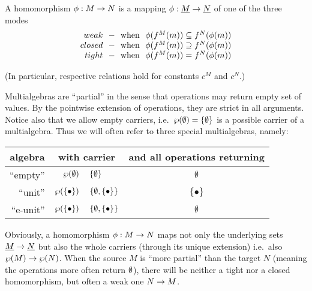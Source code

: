 \documentclass[10pt]{article}
\begin{document}
\begin{Definition}
A homomorphism $\phi:M\rightarrow N$ is a mapping $\phi: \underline {M}\rightarrow \underline {N}$ of one of the three modes 
\[
\begin{array}{r@{\ \ -\ \ {\rm when\ \ }}l}
{\sl weak} & \phi(f^M( m))\subseteq f^N(\phi( m)) \\
{\sl closed}& \phi(f^M( m))\supseteq f^N(\phi( m)) \\
{\sl tight} & \phi(f^M( m))= f^N(\phi( m)) 
\end{array} 
\]
\end{Definition}
(In particular, respective relations hold for constants $c^M$ and $c^N$.)

Multialgebras are ``partial'' in the sense that operations may return
empty set of values. By the pointwise extension of operations, they
are strict in all arguments.  Notice also that we allow empty
carriers, i.e.\ $\wp(\emptyset)=\{\emptyset\}$ is a possible carrier of a
multialgebra. Thus we will often refer to three special multialgebras,
namely:

\begin{center}
\begin{tabular}{r|r@{\ =\ }l@{\ \ }c}
algebra     & \multicolumn{2}{c}{with carrier} & and all operations returning \\ \hline
``empty''   & $\wp(\emptyset)$ & $\{\emptyset\} $ & $\emptyset$ \\[.5ex]
``unit''    & $\wp(\{\bullet\})$ & $\{\emptyset,\{\bullet\}\}$ & $\{\bullet\}$  \\[.5ex]
``e-unit''  & $\wp(\{\bullet\})$ & $\{\emptyset,\{\bullet\}\}$ & $\emptyset$
\end{tabular} 
\end{center}

\noindent

Obviously, a homomorphism $\phi:M\rightarrow N$ maps not only the underlying
sets $\underline {M}\rightarrow \underline {N}$ but also the whole carriers (through its
unique extension) i.e.\ also $\wp(M)\rightarrow\wp(N)$.  When the source
$M$ is ``more partial'' than the target $N$ (meaning the operations
more often return $\emptyset$), there will be neither a tight nor a closed
homomorphism, but often a weak one $N\rightarrow M$.
\end{document}
